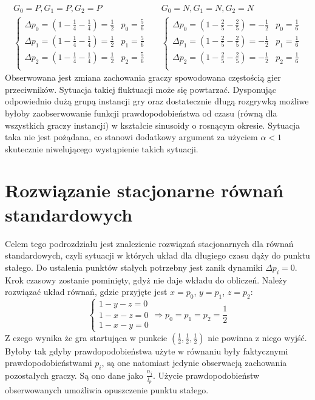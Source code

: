 \begin{align*}
G_0 = P, G_1 = P, G_2 = P && G_0 = N, G_1 = N, G_2 = N \\
\left\{
\begin{array}{cc}
\Delta p_0 = (1 - \frac{1}{4} - \frac{1}{4}) =  \frac{1}{2} & p_0= \frac{5}{6}\\
\Delta p_1 = (1 - \frac{1}{4} - \frac{1}{4}) =  \frac{1}{2} & p_1= \frac{5}{6}\\
\Delta p_2 = (1 - \frac{1}{4} - \frac{1}{4}) =  \frac{1}{2} & p_2= \frac{5}{6}\\
\end{array} 
\right. &&
\left\{
\begin{array}{cc}
\Delta p_0 = (1 - \frac{2}{5} - \frac{2}{5}) =  -\frac{1}{2} & p_0= \frac{1}{6}\\
\Delta p_1 = (1 - \frac{2}{5} - \frac{2}{5}) =  -\frac{1}{2} & p_1= \frac{1}{6}\\
\Delta p_2 = (1 - \frac{2}{5} - \frac{2}{5}) =  -\frac{1}{2} & p_2= \frac{1}{6}\\
\end{array}
\right.
\end{align*}
Obserwowana jest zmiana zachowania graczy spowodowana częstością gier przeciwników. Sytuacja takiej fluktuacji może się powtarzać. Dysponując odpowiednio dużą grupą instancji gry oraz dostatecznie długą rozgrywką możliwe byłoby zaobserwowanie funkcji prawdopodobieństwa od czasu (równą dla wszystkich graczy instancji) w kształcie sinusoidy o rosnącym okresie.
Sytuacja taka nie jest pożądana, co stanowi dodatkowy argument za użyciem $\alpha < 1$ skutecznie niwelującego wystąpienie takich sytuacji.

\section{Rozwiązanie stacjonarne równań standardowych}
\label{sec:stab_stand}
Celem tego podrozdziału jest znalezienie rozwiązań stacjonarnych dla równań standardowych, czyli sytuacji w których układ dla długiego czasu dąży do punktu stałego. Do ustalenia punktów stałych potrzebny jest zanik dynamiki $\Delta p_i = 0$. Krok czasowy zostanie pominięty, gdyż nie daje wkładu do obliczeń. Należy rozwiązać układ równań, gdzie przyjęte jest $x=p_0$, $y=p_1$, $z=p_2$:
\begin{equation}
\left\{
\begin{array}{c}
1 - y - z = 0 \\
1 - x - z = 0 \\
1 - x - y = 0
\end{array}
\right. \Rightarrow p_0 = p_1 = p_2 = \frac{1}{2}
\end{equation}
Z czego wynika że gra startująca w punkcie $(\frac{1}{2},\frac{1}{2},\frac{1}{2})$ nie powinna z niego wyjść. Byłoby tak gdyby prawdopodobieństwa użyte w równaniu były faktycznymi prawdopodobieństwami $p_i$, są one natomiast jedynie obserwacją zachowania pozostałych graczy. Są ono dane jako $\frac{n_j}{l_p}$. Użycie prawdopodobieństw obserwowanych umożliwia opuszczenie punktu stałego.
